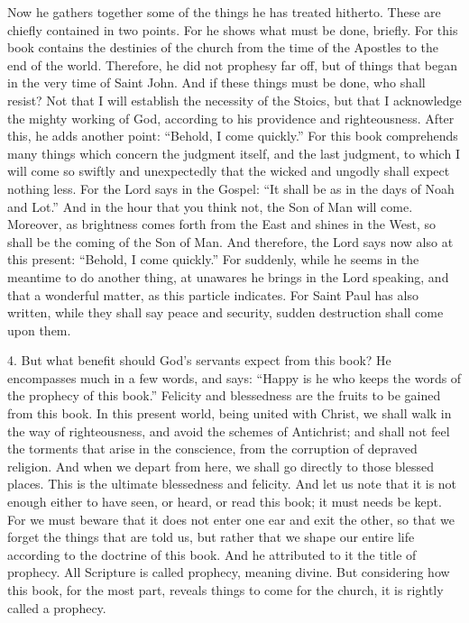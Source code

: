 Now he gathers together some of the things he has treated hitherto. These are chiefly contained in two points. For he shows what must be done, briefly. For this book contains the destinies of the church from the time of the Apostles to the end of the world. Therefore, he did not prophesy far off, but of things that began in the very time of Saint John. And if these things must be done, who shall resist? Not that I will establish the necessity of the Stoics, but that I acknowledge the mighty working of God, according to his providence and righteousness. After this, he adds another point: “Behold, I come quickly.” For this book comprehends many things which concern the judgment itself, and the last judgment, to which I will come so swiftly and unexpectedly that the wicked and ungodly shall expect nothing less. For the Lord says in the Gospel: “It shall be as in the days of Noah and Lot.” And in the hour that you think not, the Son of Man will come. Moreover, as brightness comes forth from the East and shines in the West, so shall be the coming of the Son of Man. And therefore, the Lord says now also at this present: “Behold, I come quickly.” For suddenly, while he seems in the meantime to do another thing, at unawares he brings in the Lord speaking, and that a wonderful matter, as this particle indicates. For Saint Paul has also written, while they shall say peace and security, sudden destruction shall come upon them.

4. But what benefit should God’s servants expect from this book? He encompasses much in a few words, and says: “Happy is he who keeps the words of the prophecy of this book.” Felicity and blessedness are the fruits to be gained from this book. In this present world, being united with Christ, we shall walk in the way of righteousness, and avoid the schemes of Antichrist; and shall not feel the torments that arise in the conscience, from the corruption of depraved religion. And when we depart from here, we shall go directly to those blessed places. This is the ultimate blessedness and felicity. And let us note that it is not enough either to have seen, or heard, or read this book; it must needs be kept. For we must beware that it does not enter one ear and exit the other, so that we forget the things that are told us, but rather that we shape our entire life according to the doctrine of this book. And he attributed to it the title of prophecy. All Scripture is called prophecy, meaning divine. But considering how this book, for the most part, reveals things to come for the church, it is rightly called a prophecy.

